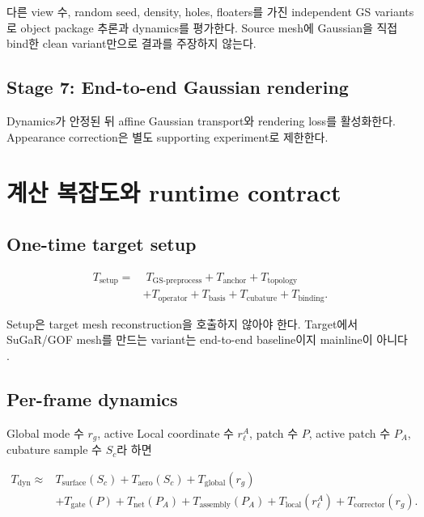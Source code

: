 \documentclass[11pt,a4paper]{article}
\begin{document}
다른 view 수, random seed, density, holes, floaters를 가진 independent GS variants로
object package 추론과 dynamics를 평가한다.
Source mesh에 Gaussian을 직접 bind한 clean variant만으로 결과를 주장하지 않는다.

\subsection{Stage 7: End-to-end Gaussian rendering}

Dynamics가 안정된 뒤 affine Gaussian transport와 rendering loss를 활성화한다.
Appearance correction은 별도 supporting experiment로 제한한다.

\section{계산 복잡도와 runtime contract}

\subsection{One-time target setup}

\begin{equation}
\begin{aligned}
  T_{\mathrm{setup}}
  =&\;
  T_{\mathrm{GS\mbox{-}preprocess}}
  +T_{\mathrm{anchor}}
  +T_{\mathrm{topology}}\\
  &+T_{\mathrm{operator}}
  +T_{\mathrm{basis}}
  +T_{\mathrm{cubature}}
  +T_{\mathrm{binding}}.
\end{aligned}
\end{equation}

Setup은 target mesh reconstruction을 호출하지 않아야 한다.
Target에서 SuGaR/GOF mesh를 만드는 variant는 end-to-end baseline이지 mainline이 아니다
\cite{guedon2024sugar,yu2024gof}.

\subsection{Per-frame dynamics}

Global mode 수 \(r_g\), active Local coordinate 수 \(r_\ell^A\),
patch 수 \(P\), active patch 수 \(P_A\), cubature sample 수 \(S_c\)라 하면

\begin{equation}
\begin{aligned}
  T_{\mathrm{dyn}}
  \approx&
  T_{\mathrm{surface}}(S_c)
  +T_{\mathrm{aero}}(S_c)
  +T_{\mathrm{global}}(r_g)\\
  &+T_{\mathrm{gate}}(P)
  +T_{\mathrm{net}}(P_A)
  +T_{\mathrm{assembly}}(P_A)
  +T_{\mathrm{local}}(r_\ell^A)
  +T_{\mathrm{corrector}}(r_g).
\end{aligned}
\end{equation}
\end{document}
